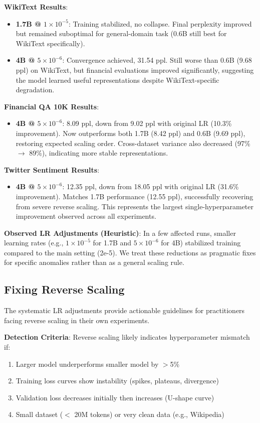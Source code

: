 \textbf{WikiText Results}:
\begin{itemize}
\item \textbf{1.7B @ $1 \times 10^{-5}$}: Training stabilized, no collapse. Final perplexity improved but remained suboptimal for general-domain task (0.6B still best for WikiText specifically).
\item \textbf{4B @ $5 \times 10^{-6}$}: Convergence achieved, 31.54 ppl. Still worse than 0.6B (9.68 ppl) on WikiText, but financial evaluations improved significantly, suggesting the model learned useful representations despite WikiText-specific degradation.
\end{itemize}

\textbf{Financial QA 10K Results}:
\begin{itemize}
\item \textbf{4B @ $5 \times 10^{-6}$}: 8.09 ppl, down from 9.02 ppl with original LR (10.3\% improvement). Now outperforms both 1.7B (8.42 ppl) and 0.6B (9.69 ppl), restoring expected scaling order. Cross-dataset variance also decreased (97\% $\to$ 89\%), indicating more stable representations.
\end{itemize}

\textbf{Twitter Sentiment Results}:
\begin{itemize}
\item \textbf{4B @ $5 \times 10^{-6}$}: 12.35 ppl, down from 18.05 ppl with original LR (31.6\% improvement). Matches 1.7B performance (12.55 ppl), successfully recovering from severe reverse scaling. This represents the largest single-hyperparameter improvement observed across all experiments.
\end{itemize}

\textbf{Observed LR Adjustments (Heuristic)}: In a few affected runs, smaller learning rates (e.g., $1\times10^{-5}$ for 1.7B and $5\times10^{-6}$ for 4B) stabilized training compared to the main setting (2e-5). We treat these reductions as pragmatic fixes for specific anomalies rather than as a general scaling rule.

\subsection{Fixing Reverse Scaling}

The systematic LR adjustments provide actionable guidelines for practitioners facing reverse scaling in their own experiments.

\textbf{Detection Criteria}: Reverse scaling likely indicates hyperparameter mismatch if:
\begin{enumerate}
\item Larger model underperforms smaller model by $>$5\%
\item Training loss curves show instability (spikes, plateaus, divergence)
\item Validation loss decreases initially then increases (U-shape curve)
\item Small dataset ($<$ 20M tokens) or very clean data (e.g., Wikipedia)
\end{enumerate}

